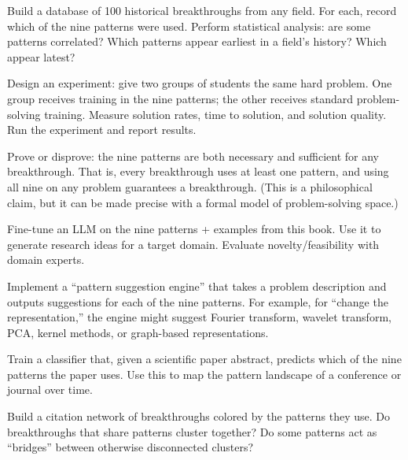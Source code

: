 \begin{exercise}[Challenge]
Build a database of 100 historical breakthroughs from any field. For each, record which of the nine patterns were used. Perform statistical analysis: are some patterns correlated? Which patterns appear earliest in a field's history? Which appear latest?
\end{exercise}

\begin{exercise}[Challenge]
Design an experiment: give two groups of students the same hard problem. One group receives training in the nine patterns; the other receives standard problem-solving training. Measure solution rates, time to solution, and solution quality. Run the experiment and report results.
\end{exercise}

\begin{exercise}[Challenge]
Prove or disprove: the nine patterns are both necessary and sufficient for any breakthrough. That is, every breakthrough uses at least one pattern, and using all nine on any problem guarantees a breakthrough. (This is a philosophical claim, but it can be made precise with a formal model of problem-solving space.)
\end{exercise}

\begin{exercise}[Computational]
Fine-tune an LLM on the nine patterns + examples from this book. Use it to generate research ideas for a target domain. Evaluate novelty/feasibility with domain experts.
\end{exercise}

\begin{exercise}[Computational]
Implement a ``pattern suggestion engine'' that takes a problem description and outputs suggestions for each of the nine patterns. For example, for ``change the representation,'' the engine might suggest Fourier transform, wavelet transform, PCA, kernel methods, or graph-based representations.
\end{exercise}

\begin{exercise}[Computational]
Train a classifier that, given a scientific paper abstract, predicts which of the nine patterns the paper uses. Use this to map the pattern landscape of a conference or journal over time.
\end{exercise}

\begin{exercise}[Computational]
Build a citation network of breakthroughs colored by the patterns they use. Do breakthroughs that share patterns cluster together? Do some patterns act as ``bridges'' between otherwise disconnected clusters?
\end{exercise}

